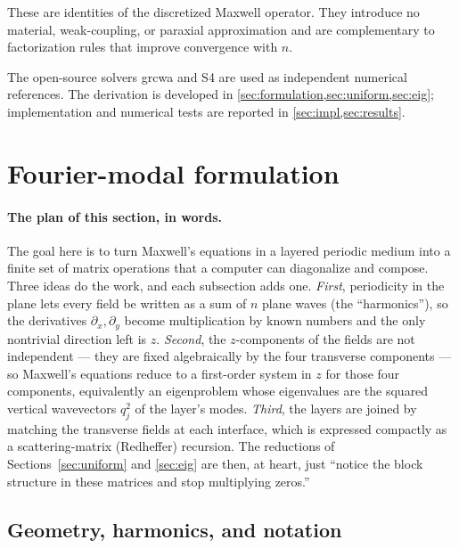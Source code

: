 \documentclass[11pt]{article}
\theoremstyle{remark}
\begin{document}
These are identities of the discretized Maxwell operator.  They introduce no
material, weak-coupling, or paraxial approximation and are complementary to
factorization rules that improve convergence with $n$.

The open-source solvers grcwa \cite{grcwa} and S4 \cite{liu2014s4} are used as
independent numerical references.  The derivation is developed in
\cref{sec:formulation,sec:uniform,sec:eig}; implementation and numerical tests
are reported in \cref{sec:impl,sec:results}.

\section{Fourier-modal formulation}
\label{sec:formulation}

\paragraph{The plan of this section, in words.}
The goal here is to turn Maxwell's equations in a layered periodic medium into
a finite set of matrix operations that a computer can diagonalize and compose.
Three ideas do the work, and each subsection adds one.  \emph{First},
periodicity in the plane lets every field be written as a sum of $n$ plane
waves (the ``harmonics''), so the derivatives $\partial_x,\partial_y$ become
multiplication by known numbers and the only nontrivial direction left is $z$.
\emph{Second}, the $z$-components of the fields are not independent --- they
are fixed algebraically by the four transverse components --- so Maxwell's
equations reduce to a first-order system in $z$ for those four components,
equivalently an eigenproblem whose eigenvalues are the squared vertical
wavevectors $q_j^2$ of the layer's modes.  \emph{Third}, the layers are joined
by matching the transverse fields at each interface, which is expressed
compactly as a scattering-matrix (Redheffer) recursion.  The reductions of
Sections~\ref{sec:uniform} and \ref{sec:eig} are then, at heart, just
``notice the block structure in these matrices and stop multiplying zeros.''

\subsection{Geometry, harmonics, and notation}
\end{document}
